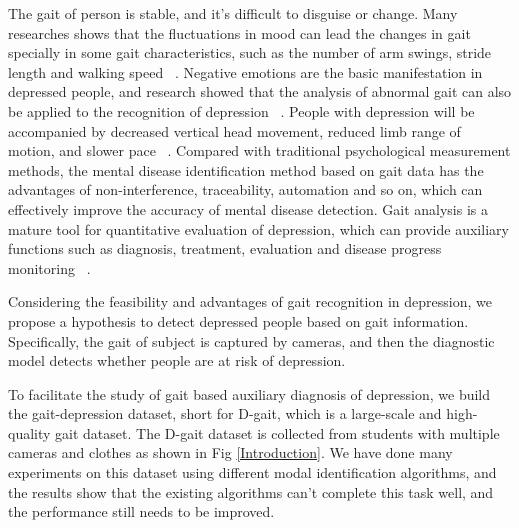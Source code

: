 \documentclass[10pt,twocolumn,letterpaper]{article}
\begin{document}
The gait of person is stable, and it’s difficult to disguise or change. Many researches shows that the fluctuations in mood can lead the changes in gait specially in some gait characteristics, such as the number of arm swings, stride length and walking speed~\cite{hicheur2013perception,montepare1987identification,roether2009critical,venture2014recognizing,gross2012effort,janssen2008recognition,kang2016effect,li2016emotion,li2016identifying,bhattacharya2020step} .
Negative emotions are the basic manifestation in depressed people, and research showed that the analysis of abnormal gait can also be applied to the recognition of depression ~\cite{michalak2009embodiment}. People with depression will be accompanied by decreased vertical head movement, reduced limb range of motion, and slower pace ~\cite{sloman1982gait,lemke2000spatiotemporal,bovi2011multiple,radovanovic2014gait,zhao2019see,yuan2018depression,fang2019depression,jing2019different}.
Compared with traditional psychological measurement methods, the mental disease identification method based on gait data has the advantages of non-interference, traceability, automation and so on, which can effectively improve the accuracy of mental disease detection. Gait analysis is a mature tool for quantitative evaluation of depression, which can provide auxiliary functions such as diagnosis, treatment, evaluation and disease progress monitoring ~\cite{baker2016gait,wang2020gait,lu2021new,wang2021detecting,yang2022data}.


Considering the feasibility and advantages of gait recognition in depression, we propose a hypothesis to detect depressed people based on gait information. Specifically, the gait of subject is captured by cameras, and then the diagnostic model detects whether people are at risk of depression.


To facilitate the study of gait based auxiliary diagnosis of depression, we build the gait-depression dataset, short for D-gait, which is a large-scale and high-quality gait dataset. The D-gait dataset is collected from students with multiple cameras and clothes as shown in Fig \ref{Introduction}. We have done many experiments on this dataset using different modal identification algorithms, and the results show that the existing algorithms can’t complete this task well, and the performance still needs to be improved.
\end{document}
